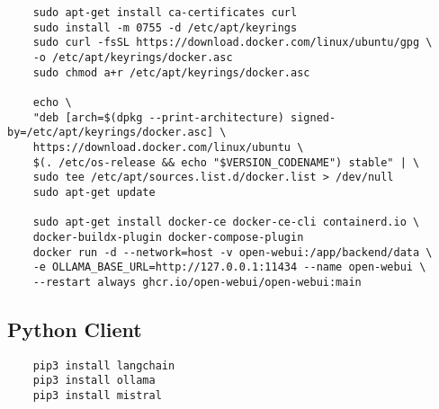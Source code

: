 \begin{verbatim}
	sudo apt-get install ca-certificates curl
	sudo install -m 0755 -d /etc/apt/keyrings
	sudo curl -fsSL https://download.docker.com/linux/ubuntu/gpg \
	-o /etc/apt/keyrings/docker.asc
	sudo chmod a+r /etc/apt/keyrings/docker.asc
	
	echo \
	"deb [arch=$(dpkg --print-architecture) signed-by=/etc/apt/keyrings/docker.asc] \
	https://download.docker.com/linux/ubuntu \
	$(. /etc/os-release && echo "$VERSION_CODENAME") stable" | \
	sudo tee /etc/apt/sources.list.d/docker.list > /dev/null
	sudo apt-get update
	
	sudo apt-get install docker-ce docker-ce-cli containerd.io \
	docker-buildx-plugin docker-compose-plugin
	docker run -d --network=host -v open-webui:/app/backend/data \
	-e OLLAMA_BASE_URL=http://127.0.0.1:11434 --name open-webui \
	--restart always ghcr.io/open-webui/open-webui:main
\end{verbatim}

\subsection{Python Client}

\begin{verbatim}
	pip3 install langchain
	pip3 install ollama
	pip3 install mistral
\end{verbatim}